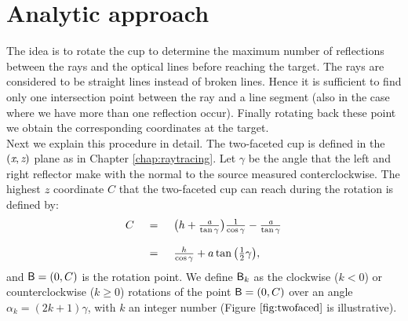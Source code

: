 \section{Analytic approach}
The idea is to rotate the cup to determine the maximum number of reflections between the rays and the optical lines before reaching the target. The rays are considered to be straight lines instead of broken lines. Hence it is sufficient to find only one intersection point between the ray and a line segment (also in the case where we have more than one reflection occur). Finally rotating back these point we obtain the corresponding coordinates at the target.\\ \indent
Next we explain this procedure in detail.
The two-faceted cup is defined in the $(\textit{x}, \textit{z})$ plane as in Chapter \ref{chap:raytracing}. 
Let $\gamma$ be the angle that the left and right reflector make with the normal to the source measured conterclockwise. 
The highest $\textit{z}$ coordinate $C$ that the two-faceted cup can reach during the rotation is defined by:
\begin{equation}\label{rotation}\begin{tabular}{llll}
$C$ & $=$ & $ \big(h+\frac{\variabile{a}}{\tan\gamma}\big)\frac{1}{\cos\gamma}-\frac{\variabile{a}}{\tan\gamma}$ \\ $ \quad$ & $ \quad $ & $ \quad $ \\$ \quad$ &  $=$ & $\frac{h}{\cos\gamma}+a\tan\big(\frac{1}{2}\gamma\big),$\end{tabular}
\end{equation} and $\textsf{B}=(0,C)$ is the rotation point. We define $\textsf{B}_k$ as the clockwise ($k<0$) or counterclockwise ($k\geq 0$) rotations of the point $\textsf{B}=(0,C)$ over an angle $\alpha_k=(2k+1)\gamma$, with $k$ an integer number (Figure $\ref{fig:twofaced}$ is illustrative).
